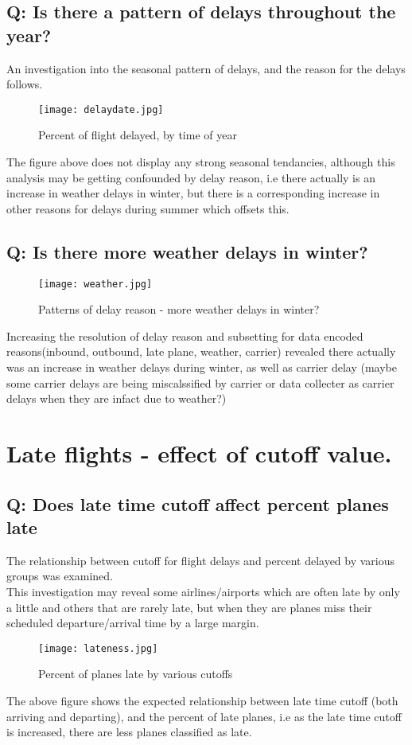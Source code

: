\documentclass[12pt]{article}
\begin{document}
		\subsection{Q: Is there a pattern of delays throughout the year?}
			An investigation into the seasonal pattern of delays, and the reason for the delays follows.
		 	\begin{figure}[h!]
				\centering
				\texttt{[image: delaydate.jpg]}
				\caption{Percent of flight delayed, by time of year}
			 \end{figure}
			The figure above does not display any strong seasonal tendancies, although this analysis may be getting confounded by delay reason, i.e there actually is an increase in weather delays in winter, but there is a corresponding increase in other reasons for delays during summer which offsets this.
			\clearpage
		\subsection{Q: Is there more weather delays in winter?}
		\begin{figure}[h!]
			\centering
			\texttt{[image: weather.jpg]}
			\caption{Patterns of delay reason - more weather delays in winter?}
		\end{figure}
		Increasing the resolution of delay reason and subsetting for data encoded reasons(inbound, outbound, late plane, weather, carrier) revealed there actually was an increase in weather delays during winter, as well as carrier delay (maybe some carrier delays are being miscalssified by carrier or data collecter as carrier delays when they are infact due to weather?)
		\newpage
	\section{Late flights - effect of cutoff value.}
		\subsection{Q: Does late time cutoff affect percent planes late}
		The relationship between cutoff for flight delays and percent delayed by various groups was examined.\\
		This investigation may reveal some airlines/airports which are often late by only a little and others that are rarely late, but when they are planes miss their scheduled departure/arrival time by a large margin.\\
		\begin{figure}[h!]
			\centering
			\texttt{[image: lateness.jpg]}
			\caption{Percent of planes late by various cutoffs}
		\end{figure}
		The above figure shows the expected relationship between late time cutoff (both arriving and departing), and the percent of late planes, i.e as the late time cutoff is increased, there are less planes classified as late.
	\newpage
\end{document}
